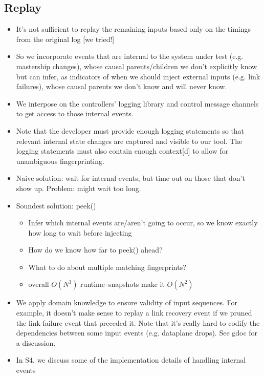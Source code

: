 \subsection{Replay}
\begin{itemize}
\item It's not sufficient to replay the remaining inputs based only on the timings from the original log [we tried!]
\item So we incorporate events that are internal to the system under test (e.g. mastership changes), whose causal parents/children we don't explicitly know but can infer, as indicators of when we should inject external inputs (e.g. link failures), whose causal parents we don't know and will never know.
\item We interpose on the controllers' logging library and control message channels to get access to those internal events.
\item Note that the developer must provide enough logging statements so that relevant internal state changes are captured and visible to our tool. The logging statements must also contain enough context[d] to allow for unambiguous fingerprinting.
\item Naive solution: wait for internal events, but time out on those that don't show up. Problem: might wait too long. 
\item Soundest solution: peek()
  \begin{itemize}
    \item Infer which internal events are/aren't going to occur, so we know exactly how long to wait before injecting
    \item How do we know how far to peek() ahead?
    \item What to do about multiple matching fingerprints?
    \item overall $O(N^3)$ runtime--snapshots make it $O(N^2)$
  \end{itemize}
\item We apply domain knowledge to ensure validity of input sequences. For
example, it doesn't make sense to replay a link recovery event if we pruned
the link failure event that preceded it. Note that it's really hard to codify
the dependencies between some input events (e.g. dataplane drops). See gdoc
for a discussion.
\item In S4, we discuss some of the implementation details of handling internal events
\end{itemize}
